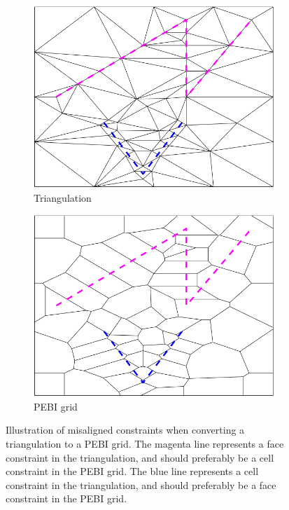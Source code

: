 \begin{figure}[ht]
    \centering
    \begin{subfigure}[b]{0.45\textwidth}
        \centering
        \includegraphics[width=\textwidth]{report/Images/Software/Gmsh limitations/gmsh_conversion_triangulation.png}
        \caption{Triangulation}
        \label{fig:limitation-triangulation}
    \end{subfigure}
    \begin{subfigure}[b]{0.45\textwidth}
        \centering
        \includegraphics[width=\textwidth]{report/Images/Software/Gmsh limitations/gmsh_conversion_PEBI.png}
        \caption{PEBI grid}
        \label{fig:limitation-pebi}
    \end{subfigure}
    \caption[Misaligned constraints when converting triangulation to PEBI grid]{Illustration of misaligned constraints when converting a triangulation to a PEBI grid. The magenta line represents a face constraint in the triangulation, and should preferably be a cell constraint in the PEBI grid. The blue line represents a cell constraint in the triangulation, and should preferably be a face constraint in the PEBI grid.}
    \label{fig:triangulation-to-PEBI-limitation}
\end{figure}


